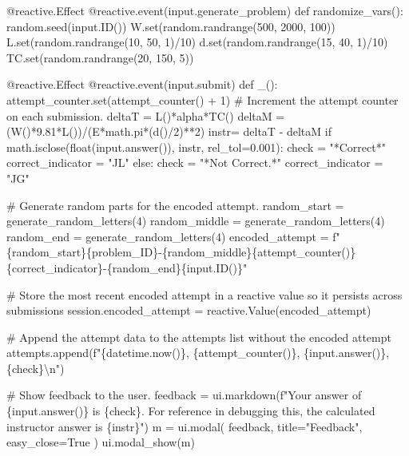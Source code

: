 \documentclass[
  letterpaper,
  DIV=11,
  numbers=noendperiod]{scrreprt}
\newenvironment{Shaded}{\begin{snugshade}}{\end{snugshade}}
\newcommand{\NormalTok}[1]{\textcolor[rgb]{0.00,0.23,0.31}{#1}}
\begin{document}
\begin{Shaded}
\begin{Highlighting}[]
\NormalTok{    @reactive.Effect}
\NormalTok{    @reactive.event(input.generate\_problem)}
\NormalTok{    def randomize\_vars():}
\NormalTok{        random.seed(input.ID())}
\NormalTok{        W.set(random.randrange(500, 2000, 100))}
\NormalTok{        L.set(random.randrange(10, 50, 1)/10)}
\NormalTok{        d.set(random.randrange(15, 40, 1)/10)}
\NormalTok{        TC.set(random.randrange(20, 150, 5))}
        
        
\NormalTok{    @reactive.Effect}
\NormalTok{    @reactive.event(input.submit)}
\NormalTok{    def \_():}
\NormalTok{        attempt\_counter.set(attempt\_counter() + 1)  \# Increment the attempt counter on each submission.}
\NormalTok{        deltaT = L()*alpha*TC()}
\NormalTok{        deltaM = (W()*9.81*L())/(E*math.pi*(d()/2)**2)}
\NormalTok{        instr= deltaT {-} deltaM}
\NormalTok{        if math.isclose(float(input.answer()), instr, rel\_tol=0.001):}
\NormalTok{            check = "*Correct*"}
\NormalTok{            correct\_indicator = "JL"}
\NormalTok{        else:}
\NormalTok{            check = "*Not Correct.*"}
\NormalTok{            correct\_indicator = "JG"}

\NormalTok{        \# Generate random parts for the encoded attempt.}
\NormalTok{        random\_start = generate\_random\_letters(4)}
\NormalTok{        random\_middle = generate\_random\_letters(4)}
\NormalTok{        random\_end = generate\_random\_letters(4)}
\NormalTok{        encoded\_attempt = f"\{random\_start\}\{problem\_ID\}{-}\{random\_middle\}\{attempt\_counter()\}\{correct\_indicator\}{-}\{random\_end\}\{input.ID()\}"}

\NormalTok{        \# Store the most recent encoded attempt in a reactive value so it persists across submissions}
\NormalTok{        session.encoded\_attempt = reactive.Value(encoded\_attempt)}

\NormalTok{        \# Append the attempt data to the attempts list without the encoded attempt}
\NormalTok{        attempts.append(f"\{datetime.now()\}, \{attempt\_counter()\}, \{input.answer()\}, \{check\}\textbackslash{}n")}

\NormalTok{        \# Show feedback to the user.}
\NormalTok{        feedback = ui.markdown(f"Your answer of \{input.answer()\} is \{check\}. For reference in debugging this, the calculated instructor answer is \{instr\}")}
\NormalTok{        m = ui.modal(}
\NormalTok{            feedback,}
\NormalTok{            title="Feedback",}
\NormalTok{            easy\_close=True}
\NormalTok{        )}
\NormalTok{        ui.modal\_show(m)}


\end{Highlighting}
\end{Shaded}
\end{document}
